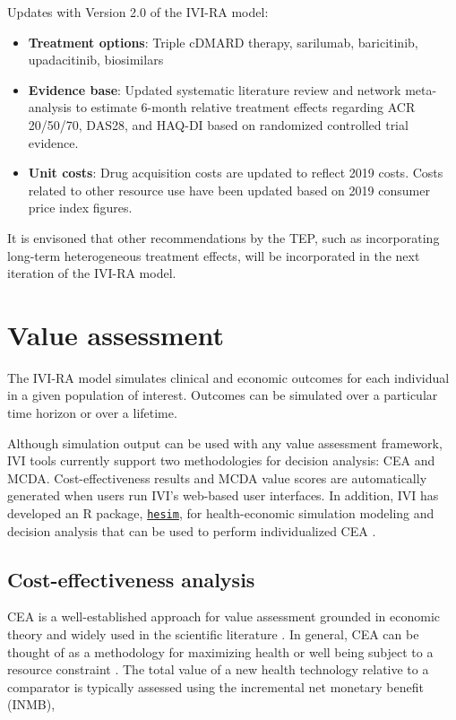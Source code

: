 \documentclass[11pt,final,fleqn]{article}
\theoremstyle{plain}
\newcommand{\code}[1]{\texttt{#1}}
\begin{document}
Updates with Version 2.0 of the IVI-RA model:
\begin{itemize}
\item \textbf{Treatment options}: Triple cDMARD therapy, sarilumab, baricitinib, upadacitinib, biosimilars
\item \textbf{Evidence base}: Updated systematic literature review and network meta-analysis to estimate 6-month relative treatment effects regarding ACR 20/50/70, DAS28, and HAQ-DI based on randomized controlled trial evidence.
\item \textbf{Unit costs}: Drug acquisition costs are updated to reflect 2019 costs. Costs related to other resource use have been updated based on 2019 consumer price index figures.
\end{itemize}
It is envisoned that other recommendations by the TEP, such as incorporating long-term heterogeneous treatment effects, will be incorporated in the next iteration of the IVI-RA model.


\section{Value assessment}\label{sec:value-assessment}
The IVI-RA model simulates clinical and economic outcomes for each individual in a given population of interest. Outcomes can be simulated over a particular time horizon or over a lifetime. 

Although simulation output can be used with any value assessment framework, IVI tools currently support two methodologies for decision analysis: CEA and MCDA. Cost-effectiveness results and MCDA value scores are automatically generated when users run IVI's web-based user interfaces. In addition, IVI has developed an R package, \code{\href{https://hesim-dev.github.io/hesim/}{hesim}}, for health-economic simulation modeling and decision analysis that can be used to perform individualized CEA \citep{basu2007value, ioannidis2011individualized, espinoza2014value}. 

\subsection{Cost-effectiveness analysis}\label{sec:cea}
CEA is a well-established approach for value assessment grounded in economic theory and widely used in the scientific literature \citep{briggs2006decision, meltzer2011theoretical, drummond2015methods}. In general, CEA can be thought of as a methodology for maximizing health or well being subject to a resource constraint \citep{garber1997economic}. The total value of a new health technology relative to a comparator is typically assessed using the incremental net monetary benefit (INMB), 
\end{document}
